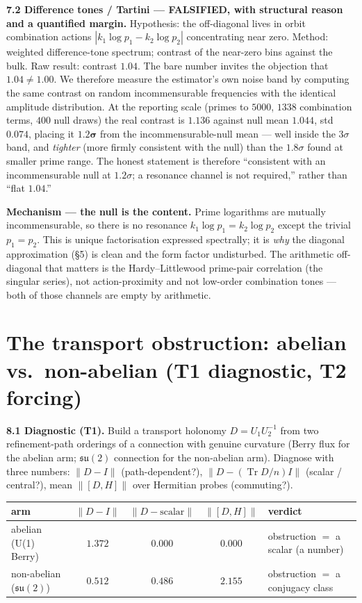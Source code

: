 \documentclass[11pt]{article}
\newcommand{\Tr}{\operatorname{Tr}}
\begin{document}
\textbf{7.2 Difference tones / Tartini --- FALSIFIED, with structural reason and a quantified margin.} Hypothesis: the off-diagonal lives in orbit combination actions $|k_1\log p_1-k_2\log p_2|$ concentrating near zero. Method: weighted difference-tone spectrum; contrast of the near-zero bins against the bulk. Raw result: contrast $\mathbf{1.04}$. The bare number invites the objection that $1.04\neq1.00$. We therefore measure the estimator's own noise band by computing the same contrast on random incommensurable frequencies with the identical amplitude distribution. At the reporting scale (primes to $5000$, $1338$ combination terms, $400$ null draws) the real contrast is $\mathbf{1.136}$ against null mean $1.044$, std $0.074$, placing it $\mathbf{1.2\sigma}$ from the incommensurable-null mean --- well inside the $3\sigma$ band, and \emph{tighter} (more firmly consistent with the null) than the $1.8\sigma$ found at smaller prime range. The honest statement is therefore ``consistent with an incommensurable null at $1.2\sigma$; a resonance channel is not required,'' rather than ``flat $1.04$.''

\textbf{Mechanism --- the null is the content.} Prime logarithms are mutually incommensurable, so there is no resonance $k_1\log p_1=k_2\log p_2$ except the trivial $p_1=p_2$. This is unique factorisation expressed spectrally; it is \emph{why} the diagonal approximation (\S5) is clean and the form factor undisturbed. The arithmetic off-diagonal that matters is the Hardy--Littlewood prime-pair correlation (the singular series), not action-proximity and not low-order combination tones --- both of those channels are empty by arithmetic.

\section{The transport obstruction: abelian vs.\ non-abelian (T1 diagnostic, T2 forcing)}

\textbf{8.1 Diagnostic (T1).} Build a transport holonomy $D=U_1U_2^{-1}$ from two refinement-path orderings of a connection with genuine curvature (Berry flux for the abelian arm; $\mathfrak{su}(2)$ connection for the non-abelian arm). Diagnose with three numbers: $\|D-I\|$ (path-dependent?), $\|D-(\Tr D/n)I\|$ (scalar / central?), mean $\|[D,H]\|$ over Hermitian probes (commuting?).

\begin{center}
\begin{tabular}{lcccl}
\toprule
arm & $\|D-I\|$ & $\|D-\text{scalar}\|$ & $\|[D,H]\|$ & verdict \\
\midrule
abelian (U(1) Berry) & $1.372$ & $\mathbf{0.000}$ & $\mathbf{0.000}$ & obstruction $=$ a scalar (a number) \\
non-abelian ($\mathfrak{su}(2)$) & $0.512$ & $0.486$ & $\mathbf{2.155}$ & obstruction $=$ a conjugacy class \\
\bottomrule
\end{tabular}
\end{center}
\end{document}
